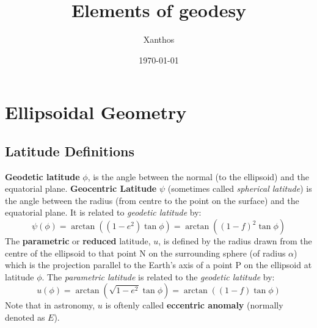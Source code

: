 \documentclass{article}
\title{Elements of geodesy}
\date{\today}
\author{Xanthos}
\begin{document}
  
  \maketitle

  \tableofcontents
  \listoffigures
  \listoftables

  \section{Ellipsoidal Geometry}
  \label{ch:ellipsoidal-geometry}

  \subsection{Latitude Definitions}
  \label{ssec:latitude-definitions}
  
  \textbf{Geodetic latitude} $\phi$, is the angle between the normal (to the 
  ellipsoid) and the equatorial plane.
  \textbf{Geocentric Latitude} $\psi$ (sometimes called \emph{spherical latitude}) is 
  the angle between the radius (from centre to the point on the surface) and 
  the equatorial plane. It is related to \emph{geodetic latitude} by:
  \begin{equation}
    \psi (\phi) = \arctan{\left(\left(1-e^2\right)\tan \phi \right)} 
      = \arctan{\left(\left(1-f\right)^2 \tan \phi \right)}
  \end{equation}
  The \textbf{parametric} or \textbf{reduced} latitude, $u$, is defined 
  by the radius drawn from the centre of the ellipsoid to that point N on the 
  surrounding sphere (of radius $\alpha$) which is the projection parallel to 
  the Earth's axis of a point P on the ellipsoid at latitude $\phi$. The 
  \emph{parametric latitude} is related to the \emph{geodetic latitude} by:
  \begin{equation}
    u(\phi) = \arctan{\left( \sqrt{1-e^2} \tan \phi \right)} 
      = \arctan{\left(\left(1-f\right) \tan \phi \right)}
  \end{equation}
  Note that in astronomy, $u$ is oftenly called \textbf{eccentric anomaly} 
  (normally denoted as $E$).
\end{document}

